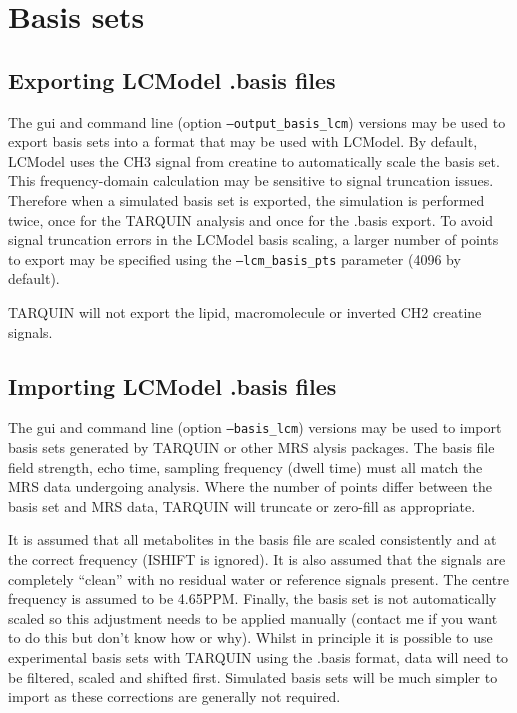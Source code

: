\documentclass[a4paper,12pt]{article}
\begin{document}

\section{Basis sets}

\subsection{Exporting LCModel .basis files}
The gui and command line (option \texttt{---output\_basis\_lcm}) versions may be used to export basis sets into a format that may be used with LCModel. By default, LCModel uses the CH3 signal from creatine to automatically scale the basis set. This frequency-domain calculation may be sensitive to signal truncation issues. Therefore when a simulated basis set is exported, the simulation is performed twice, once for the TARQUIN analysis and once for the .basis export. To avoid signal truncation errors in the LCModel basis scaling, a larger number of points to export may be specified using the \texttt{---lcm\_basis\_pts} parameter (4096 by default).

TARQUIN will not export the lipid, macromolecule or inverted CH2 creatine signals.

\subsection{Importing LCModel .basis files}
The gui and command line (option \texttt{---basis\_lcm}) versions may be used to import basis sets generated by TARQUIN or other MRS alysis packages. The basis file field strength, echo time, sampling frequency (dwell time) must all match the MRS data undergoing analysis. Where the number of points differ between the basis set and MRS data, TARQUIN will truncate or zero-fill as appropriate.

It is assumed that all metabolites in the basis file are scaled consistently and at the correct frequency (ISHIFT is ignored). It is also assumed that the signals are completely ``clean'' with no residual water or reference signals present. The centre frequency is assumed to be 4.65PPM. Finally, the basis set is not automatically scaled so this adjustment needs to be applied manually (contact me if you want to do this but don't know how or why). Whilst in principle it is possible to use experimental basis sets with TARQUIN using the .basis format, data will need to be filtered, scaled and shifted first. Simulated basis sets will be much simpler to import as these corrections are generally not required.
\end{document}
